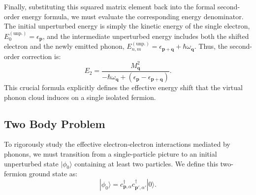 \begin{example}
    Finally, substituting this squared matrix element back into the formal second-order energy formula, we must evaluate the corresponding energy denominator. The initial unperturbed energy is simply the kinetic energy of the single electron, \(E_0^{(\text{unp.})} = \epsilon_{\mathbf{p}}\), and the intermediate unperturbed energy includes both the shifted electron and the newly emitted phonon, \(E_{n,m}^{(\text{unp.})} = \epsilon_{\mathbf{p}+\mathbf{q}} + \hbar\omega_{\mathbf{q}}\). Thus, the second-order correction is:
    \begin{equation} \label{eq:single_electron_shift}
        E_2 = \frac{M_{\mathbf{q}}^2}{-\hbar\omega_{\mathbf{q}} + (\epsilon_{\mathbf{p}} - \epsilon_{\mathbf{p}+\mathbf{q}})}.
    \end{equation}
    This crucial formula explicitly defines the effective energy shift that the virtual phonon cloud induces on a single isolated fermion.
\end{example}

\subsection{Two Body Problem}

To rigorously study the effective electron-electron interactions mediated by phonons, we must transition from a single-particle picture to an initial unperturbed state \( |\phi_0\rangle \) containing at least two particles. We define this two-fermion ground state as:
\[
    |\phi_0\rangle = c_{\mathbf{p},\alpha}^\dagger c_{\mathbf{p}',\alpha'}^\dagger |0\rangle.
\]

